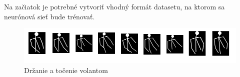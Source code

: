 \documentclass[slovak,master,dept460,male,cpp,cpdeclaration]{diploma}
\begin{document}
Na začiatok je potrebné vytvoriť vhodný formát datasetu, na ktorom sa neurónová sieť  bude trénovať.

\begin{figure}[H]
	\centering
	\includegraphics[width=1\textwidth]{Figures/NNsteering.png}
	\caption{Držanie a točenie volantom}
	\label{fig:radioUsage}
\end{figure}













 
 
\newpage
\end{document}
